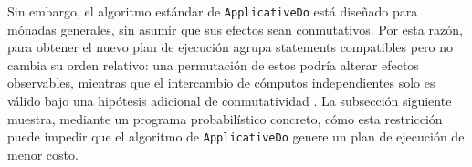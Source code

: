 Sin embargo, el algoritmo estándar de \texttt{ApplicativeDo} está diseñado para mónadas generales, sin asumir que sus efectos sean conmutativos. Por esta razón, para obtener el nuevo plan de ejecución agrupa statements compatibles pero no cambia su orden relativo: una permutación de estos podría alterar efectos observables, mientras que el intercambio de cómputos independientes solo es válido bajo una hipótesis adicional de conmutatividad \cite[pp.~94--95]{MarlowPJKM2016}. La subsección siguiente muestra, mediante un programa probabilístico concreto, cómo esta restricción puede impedir que el algoritmo de \texttt{ApplicativeDo} genere un plan de ejecución de menor costo.
